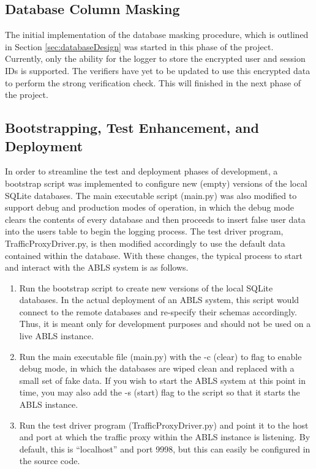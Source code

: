 \documentclass{sig-alternate}
\begin{document}

\subsection{Database Column Masking}
The initial implementation of the database masking procedure, which is outlined in Section \ref{sec:databaseDesign}
was started in this phase of the project. Currently, only the ability for the logger to store the encrypted user and session IDs 
is supported. The verifiers have yet to be updated to use this encrypted data to perform the strong verification check. This 
will finished in the next phase of the project.

\subsection{Bootstrapping, Test Enhancement, and Deployment}
In order to streamline the test and deployment phases of development, a bootstrap script was implemented to configure
new (empty) versions of the local SQLite databases. The main executable script (main.py) was also modified to support
debug and production modes of operation, in which the debug mode clears the contents of every database and
then proceeds to insert false user data into the users table to begin the logging process. The test driver program,
TrafficProxyDriver.py, is then modified accordingly to use the default data contained within the database. With these
changes, the typical process to start and interact with the ABLS system is as follows.

\begin{enumerate}
	\item Run the bootstrap script to create new versions of the local SQLite databases. In the actual deployment of an ABLS system, this script would connect to the remote databases and re-specify their schemas accordingly. Thus, it is meant only for development purposes and should not be used on a live ABLS instance.
	\item Run the main executable file (main.py) with the -c (clear) to flag to enable debug mode, in which the databases are wiped clean and replaced with a small set of fake data. If you wish to start the ABLS system at this point in time, you may also add the -s (start) flag to the script so that it starts the ABLS instance.
	\item Run the test driver program (TrafficProxyDriver.py) and point it to the host and port at which the traffic proxy within the ABLS instance is listening. By default, this is ``localhost'' and port 9998, but this can easily be configured in the source code. 
\end{enumerate}
\end{document}
